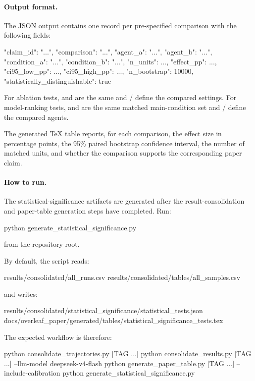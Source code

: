 \documentclass[11pt]{article}
\begin{document}
\paragraph{Output format.}
The JSON output contains one record per pre-specified comparison with the following fields:
\begin{DocCode}
{
  "claim_id": "...",
  "comparison": "...",
  "agent_a": "...",
  "agent_b": "...",
  "condition_a": "...",
  "condition_b": "...",
  "n_units": ...,
  "effect_pp": ...,
  "ci95_low_pp": ...,
  "ci95_high_pp": ...,
  "n_bootstrap": 10000,
  "statistically_distinguishable": true
}
\end{DocCode}
For ablation tests,  and  are the same and / define the compared settings.
For model-ranking tests,  and  are the same matched main-condition set and / define the compared agents.

The generated TeX table reports, for each comparison, the effect size in percentage points, the 95\% paired bootstrap confidence interval, the number of matched units, and whether the comparison supports the corresponding paper claim.

\paragraph{How to run.}
The statistical-significance artifacts are generated after the result-consolidation and paper-table generation steps have completed.
Run:
\begin{DocCode}
python generate_statistical_significance.py
\end{DocCode}
from the repository root.

By default, the script reads:
\begin{DocCode}
results/consolidated/all_runs.csv
results/consolidated/tables/all_samples.csv
\end{DocCode}
and writes:
\begin{DocCode}
results/consolidated/statistical_significance/statistical_tests.json
docs/overleaf_paper/generated/tables/statistical_significance_tests.tex
\end{DocCode}

The expected workflow is therefore:
\begin{DocCode}
python consolidate_trajectories.py [TAG ...]
python consolidate_results.py [TAG ...] --llm-model deepseek-v4-flash
python generate_paper_table.py [TAG ...] --include-calibration
python generate_statistical_significance.py
\end{DocCode}
\end{document}
